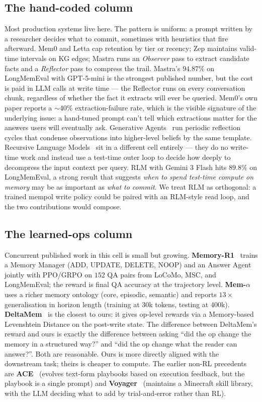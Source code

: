 \documentclass[11pt]{article}
\begin{document}
\subsection{The hand-coded column}

Most production systems live here. The pattern is uniform: a prompt
written by a researcher decides what to commit, sometimes with
heuristics that fire afterward. Mem0 and Letta cap retention by tier or
recency; Zep maintains valid-time intervals on KG edges; Mastra runs an
\emph{Observer} pass to extract candidate facts and a \emph{Reflector}
pass to compress the trail. Mastra's $94.87\%$ on LongMemEval with
GPT-5-mini is the strongest published number, but the cost is paid in
LLM calls at write time --- the Reflector runs on every conversation
chunk, regardless of whether the fact it extracts will ever be queried.
Mem0's own paper reports a $\sim 40\%$ extraction-failure rate, which
is the visible signature of the underlying issue: a hand-tuned prompt
can't tell which extractions matter for the answers users will
eventually ask. Generative Agents~\cite{park2023generative} run
periodic reflection cycles that condense observations into higher-level
beliefs by the same template. Recursive Language
Models~\cite{rlm2025} sit in a different cell entirely --- they do
no write-time work and instead use a test-time outer loop to decide
how deeply to decompress the input context per query. RLM with
Gemini 3 Flash hits $89.8\%$ on LongMemEval, a strong result that
suggests \emph{when to spend test-time compute on memory} may be as
important as \emph{what to commit}. We treat RLM as orthogonal: a
trained mempol write policy could be paired with an RLM-style read
loop, and the two contributions would compose.

\subsection{The learned-ops column}

Concurrent published work in this cell is small but growing.
\textbf{Memory-R1}~\cite{memoryR1} trains a Memory Manager (ADD,
UPDATE, DELETE, NOOP) and an Answer Agent jointly with PPO/GRPO on
$152$ QA pairs from LoCoMo, MSC, and LongMemEval; the reward is final
QA accuracy at the trajectory level. \textbf{Mem-$\alpha$}~\cite{memalpha2025}
uses a richer memory ontology (core, episodic, semantic) and reports
$13\times$ generalisation in horizon length (training at 30k tokens,
testing at 400k). \textbf{DeltaMem}~\cite{deltamem2026} is the closest
to ours: it gives op-level rewards via a Memory-based Levenshtein
Distance on the post-write state. The difference between DeltaMem's
reward and ours is exactly the difference between asking ``did the op
change the memory in a structured way?'' and ``did the op change what
the reader can answer?''. Both are reasonable. Ours is more directly
aligned with the downstream task; theirs is cheaper to compute.
The earlier non-RL precedents are \textbf{ACE}~\cite{ace2026} (evolves
text-form playbooks based on execution feedback, but the playbook is a
single prompt) and \textbf{Voyager}~\cite{wang2023voyager} (maintains a
Minecraft skill library, with the LLM deciding what to add by
trial-and-error rather than RL).
\end{document}

